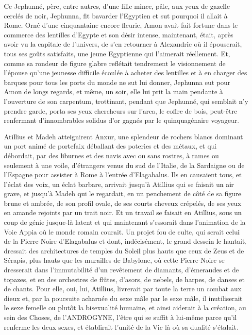 \documentclass[a4paper, 11pt, oneside, polutonikogreek, french]{article}
\begin{document}
Ce Jephunné, père, entre autres, d'une fille mince, pâle, aux yeux de gazelle cerclés de noir, Jephunna, fit bavarder l'Egyptien et sut pourquoi il allait à Rome. Orné d'une cinquantaine encore fleurie, Amon avait fait fortune dans le commerce des lentilles d'Egypte et son désir intense, maintenant, était, après avoir vu la capitale de l'univers, de s'en retourner à Alexandrie où il épouserait, tous ses goûts satisfaits, une jeune Egyptienne qui l'aimerait réellement. Et, comme sa rondeur de figure glabre reflétait tendrement le visionnement de l'épouse qu'une jeunesse difficile écoulée à acheter des lentilles et à en charger des barques pour tous les ports du monde ne sut lui donner, Jephunna eut pour Amon de longs regards, et même, un soir, elle lui prit la main pendante à l'ouverture de son carpentum, trottinant, pendant que Jephunné, qui semblait n'y prendre garde, porta ses yeux chercheurs sur l'arca, le coffre de bois, peut-être renfermant d'innombrables solidus d'or gagnés par le quinquagénaire voyageur.

Atillius et Madeh atteignirent Anxur, une splendeur de rochers blancs dominant un port animé de portefaix déballant des poteries et des métaux, et qui débordait, par des liburnes et des navis avec ou sans rostres, à rames ou seulement à une voile, d'étrangers venus du sud de l'Italie, de la Sardaigne ou de l'Espagne pour assister à Rome à l'entrée d'Elagabalus. Ils en causaient tous, et l'éclat des voix, un éclat barbare, arrivait jusqu'à Atillius qui se faisait un air grave, et jusqu'à Madeh qui le regardait, en un penchement de côté de sa figure brune et ambrée, de son profil ovale, de ses courts cheveux crépelés, de ses yeux en amande rejoints par un trait noir. Et un travail se faisait en Atillius, sous un coup de génie jusque-là latent et qui maintenant s'essorait dans l'animation de la Voie Appia où le monde romain courait. Un projet fou de culte, qui serait celui de la Pierre-Noire d'Elagabalus et dont, indécisément, le grand dessein le hantait, dressait des architectures de temples du Soleil plus hauts que ceux de Zeus et de Sérapis, plus hauts que les murailles de Babylone, où cette Pierre-Noire se dresserait dans l'immutabilité d'un revêtement de diamants, d'émeraudes et de topazes, et en des orchestres de flûtes, d'asors, de nebels, de harpes, de danses et de chants. Pour elle, oui, lui, Atillius, livrerait par toute la terre un combat aux dieux et, par la poursuite acharnée du sexe mâle par le sexe mâle, il inutiliserait le sexe femelle ou plutôt la bisexualité humaine, et ainsi aiderait à la création, au sein des Choses, de l’ANDROGYNE, l'être qui se suffit à lui-même parce qu'il renferme les deux sexes, et établirait l'unité de la Vie là où sa dualité s'étalait.
\end{document}
